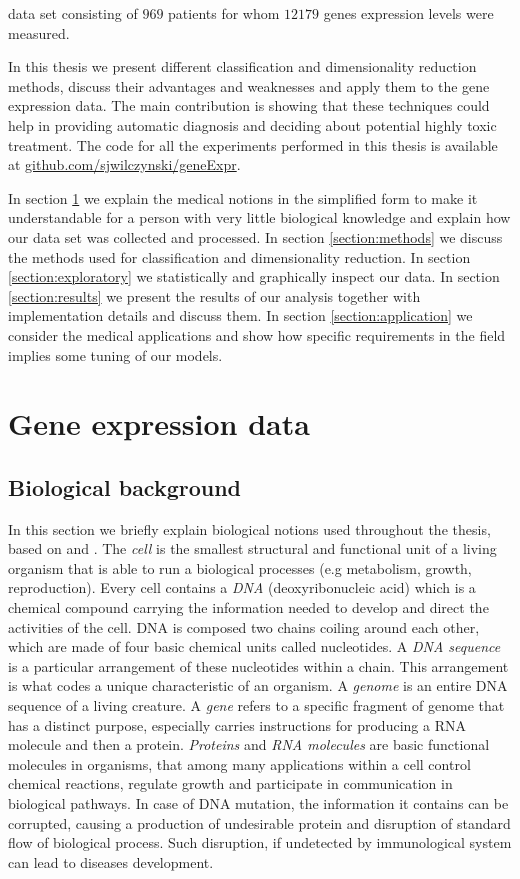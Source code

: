 \documentclass[shortabstract, english, mgr]{iithesis}
\begin{document}
data set consisting of $969$ patients for whom $12179$ genes expression levels were measured.

In this thesis we present different classification and dimensionality reduction methods, discuss their advantages and weaknesses and apply them to the gene expression data. The main contribution is showing that these techniques could help in providing automatic diagnosis and deciding about potential highly toxic treatment. The code for all the experiments performed in this thesis is available at \url{github.com/sjwilczynski/geneExpr}.  


In section \ref{section:bio} we explain the medical notions in the simplified form to make it understandable for a person with very little biological knowledge and explain how our data set was collected and processed. In section \ref{section:methods} we discuss the methods used for classification and dimensionality reduction. In section \ref{section:exploratory} we statistically and graphically inspect our data. In section \ref{section:results} we present the results of our analysis together with implementation details and discuss them. In section \ref{section:application} we consider the medical applications and show how specific requirements in the field implies some tuning of our models.

\section{Gene expression data} \label{section:bio}

\subsection{Biological background} 
In this section we briefly explain biological notions used throughout the thesis, based on \cite{NHGRI} and \cite[chapters~11,12]{GeneExpr}. The \textit{cell} is the smallest structural and functional unit of a living organism that is able to run a biological processes (e.g metabolism, growth, reproduction). Every cell contains a \textit{DNA} (deoxyribonucleic acid) which is a chemical compound carrying the information needed to develop and direct the activities of the cell. DNA is composed two chains coiling around each other, which are made of four basic chemical units called nucleotides. A \textit{DNA sequence} is a particular arrangement of these nucleotides within a chain. This arrangement is what codes a unique characteristic of an organism. A \textit{genome} is an entire DNA sequence of a living creature. A \textit{gene} refers to a specific fragment of genome that has a distinct purpose, especially carries instructions for producing a RNA molecule and then a protein. \textit{Proteins} and \textit{RNA molecules} are basic functional molecules in organisms, that among many applications within a cell control chemical reactions, regulate growth and participate in communication in biological pathways. In case of DNA mutation, the information it contains can be corrupted, causing a production of undesirable protein and disruption of standard flow of biological process. Such disruption, if undetected by immunological system can lead to diseases development.
\end{document}
